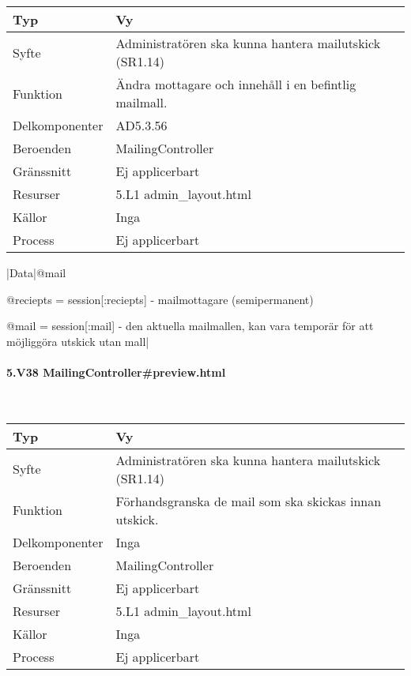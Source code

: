 \documentclass[a4paper, twoside, 11pt, titlepage]{article}
\begin{document}
			\begin {table} [ht] \begin{tabular} {  p{3.5cm} p{9.6cm} }
				\hline
				Typ & Vy  \\
				\hline
				Syfte & Administratören ska kunna hantera mailutskick (SR1.14)  \\
				\hline
				Funktion & Ändra mottagare och innehåll i en befintlig mailmall.  \\
				\hline
				Delkomponenter & AD5.3.56  \\
				\hline
				Beroenden & MailingController  \\
				\hline
				Gränssnitt & Ej applicerbart  \\
				\hline
				Resurser & 5.L1 admin\_layout.html  \\
				\hline
				Källor & Inga  \\
				\hline
				Process & Ej applicerbart  \\
				\hline
			\end{tabular} \end{table} \FloatBarrier
			\vspace{6mm}

			|Data|@mail

			@reciepts = session[:reciepts] - mailmottagare (semipermanent)

			@mail = session[:mail] - den aktuella mailmallen, kan vara temporär för att möjliggöra utskick utan mall|

			\paragraph{5.V38 MailingController\#preview.html}\

			\begin {table} [ht] \begin{tabular} {  p{3.5cm} p{9.6cm} }
				\hline
				Typ & Vy  \\
				\hline
				Syfte & Administratören ska kunna hantera mailutskick (SR1.14)  \\
				\hline
				Funktion & Förhandsgranska de mail som ska skickas innan utskick.  \\
				\hline
				Delkomponenter & Inga  \\
				\hline
				Beroenden & MailingController  \\
				\hline
				Gränssnitt & Ej applicerbart  \\
				\hline
				Resurser & 5.L1 admin\_layout.html  \\
				\hline
				Källor & Inga  \\
				\hline
				Process & Ej applicerbart  \\
				\hline
			\end{tabular} \end{table} \FloatBarrier
			\vspace{6mm}
\end{document}
